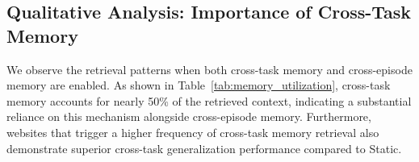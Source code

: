 \subsection{Qualitative Analysis: Importance of Cross-Task Memory}
We observe the retrieval patterns when both cross-task memory and cross-episode memory are enabled. As shown in Table~\ref {tab:memory_utilization}, cross-task memory accounts for nearly 50\% of the retrieved context, indicating a substantial reliance on this mechanism alongside cross-episode memory. Furthermore,  websites that trigger a higher frequency of cross-task memory retrieval also demonstrate superior cross-task generalization performance compared to Static. 




% 



